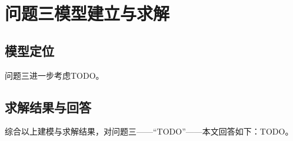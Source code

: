 \section{问题三模型建立与求解}

\subsection{模型定位}

问题三进一步考虑TODO。

\subsection{求解结果与回答}

综合以上建模与求解结果，对问题三——``TODO''——本文回答如下：TODO。
